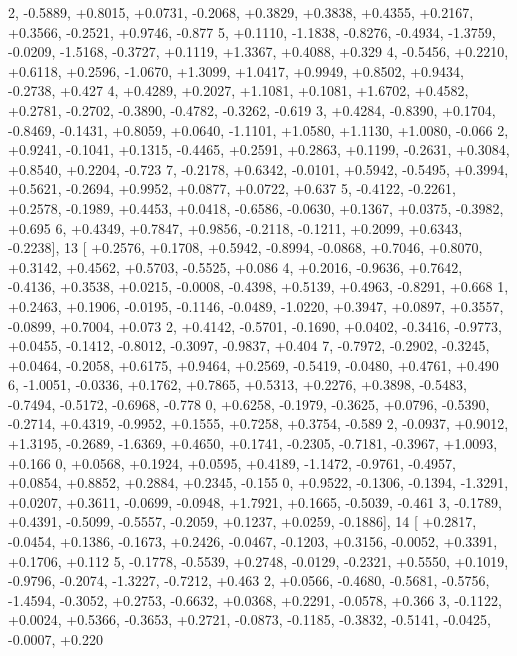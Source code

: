 \begin{DoxyCode}
      2, -0.5889, +0.8015, +0.0731, -0.2068, +0.3829, +0.3838, +0.4355, +0.2167, +0.3566, -0.2521, +0.9746, -0.877
      5, +0.1110, -1.1838, -0.8276, -0.4934, -1.3759, -0.0209, -1.5168, -0.3727, +0.1119, +1.3367, +0.4088, +0.329
      4, -0.5456, +0.2210, +0.6118, +0.2596, -1.0670, +1.3099, +1.0417, +0.9949, +0.8502, +0.9434, -0.2738, +0.427
      4, +0.4289, +0.2027, +1.1081, +0.1081, +1.6702, +0.4582, +0.2781, -0.2702, -0.3890, -0.4782, -0.3262, -0.619
      3, +0.4284, -0.8390, +0.1704, -0.8469, -0.1431, +0.8059, +0.0640, -1.1101, +1.0580, +1.1130, +1.0080, -0.066
      2, +0.9241, -0.1041, +0.1315, -0.4465, +0.2591, +0.2863, +0.1199, -0.2631, +0.3084, +0.8540, +0.2204, -0.723
      7, -0.2178, +0.6342, -0.0101, +0.5942, -0.5495, +0.3994, +0.5621, -0.2694, +0.9952, +0.0877, +0.0722, +0.637
      5, -0.4122, -0.2261, +0.2578, -0.1989, +0.4453, +0.0418, -0.6586, -0.0630, +0.1367, +0.0375, -0.3982, +0.695
      6, +0.4349, +0.7847, +0.9856, -0.2118, -0.1211, +0.2099, +0.6343, -0.2238],
13 [ +0.2576, +0.1708, +0.5942, -0.8994, -0.0868, +0.7046, +0.8070, +0.3142, +0.4562, +0.5703, -0.5525, +0.086
      4, +0.2016, -0.9636, +0.7642, -0.4136, +0.3538, +0.0215, -0.0008, -0.4398, +0.5139, +0.4963, -0.8291, +0.668
      1, +0.2463, +0.1906, -0.0195, -0.1146, -0.0489, -1.0220, +0.3947, +0.0897, +0.3557, -0.0899, +0.7004, +0.073
      2, +0.4142, -0.5701, -0.1690, +0.0402, -0.3416, -0.9773, +0.0455, -0.1412, -0.8012, -0.3097, -0.9837, +0.404
      7, -0.7972, -0.2902, -0.3245, +0.0464, -0.2058, +0.6175, +0.9464, +0.2569, -0.5419, -0.0480, +0.4761, +0.490
      6, -1.0051, -0.0336, +0.1762, +0.7865, +0.5313, +0.2276, +0.3898, -0.5483, -0.7494, -0.5172, -0.6968, -0.778
      0, +0.6258, -0.1979, -0.3625, +0.0796, -0.5390, -0.2714, +0.4319, -0.9952, +0.1555, +0.7258, +0.3754, -0.589
      2, -0.0937, +0.9012, +1.3195, -0.2689, -1.6369, +0.4650, +0.1741, -0.2305, -0.7181, -0.3967, +1.0093, +0.166
      0, +0.0568, +0.1924, +0.0595, +0.4189, -1.1472, -0.9761, -0.4957, +0.0854, +0.8852, +0.2884, +0.2345, -0.155
      0, +0.9522, -0.1306, -0.1394, -1.3291, +0.0207, +0.3611, -0.0699, -0.0948, +1.7921, +0.1665, -0.5039, -0.461
      3, -0.1789, +0.4391, -0.5099, -0.5557, -0.2059, +0.1237, +0.0259, -0.1886],
14 [ +0.2817, -0.0454, +0.1386, -0.1673, +0.2426, -0.0467, -0.1203, +0.3156, -0.0052, +0.3391, +0.1706, +0.112
      5, -0.1778, -0.5539, +0.2748, -0.0129, -0.2321, +0.5550, +0.1019, -0.9796, -0.2074, -1.3227, -0.7212, +0.463
      2, +0.0566, -0.4680, -0.5681, -0.5756, -1.4594, -0.3052, +0.2753, -0.6632, +0.0368, +0.2291, -0.0578, +0.366
      3, -0.1122, +0.0024, +0.5366, -0.3653, +0.2721, -0.0873, -0.1185, -0.3832, -0.5141, -0.0425, -0.0007, +0.220

\end{DoxyCode}
